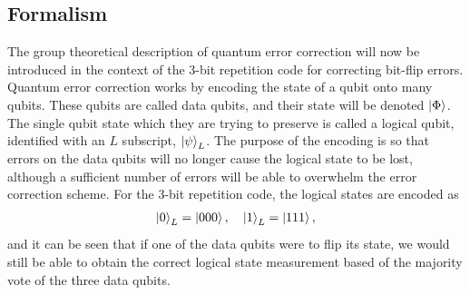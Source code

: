 \documentclass[../Thesis.tex]{subfiles}
\begin{document}
\subsection{Formalism}
The group theoretical description of quantum error correction will now be introduced in the context of the 3-bit repetition code for correcting bit-flip errors. 
Quantum error correction works by encoding the state of a qubit onto many qubits. 
These qubits are called data qubits, and their state will be denoted $\ket{\Phi}$. The single qubit state which they are trying to preserve is called a logical qubit, identified with an $L$ subscript, $\ket{\psi}_L$. The purpose of the encoding is so that errors on the data qubits will no longer cause the logical state to be lost, although a sufficient number of errors will be able to overwhelm the error correction scheme. For the 3-bit repetition code, the logical states are encoded as
\begin{align}
    \ket{0}_L=\ket{000},\quad \ket{1}_L=\ket{111},
\end{align}
and it can be seen that if one of the data qubits were to flip its state, we would still be able to obtain the correct logical state measurement based of the majority vote of the three data qubits.
\end{document}

